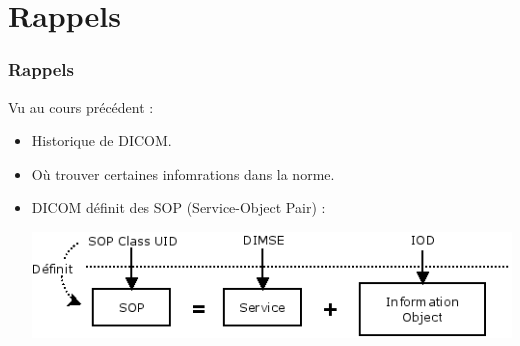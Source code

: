\section{Rappels}

\frame
{
	\frametitle{Rappels}
	Vu au cours pr\'ec\'edent :
	\begin{itemize}
		\item Historique de DICOM.
		\item Où trouver certaines infomrations dans la norme.
		\item DICOM d\'efinit des SOP (Service-Object Pair) :
		\begin{center}
			\includegraphics[width=\linewidth]{./figures/sop-definition.png}
		\end{center}
	\end{itemize}
}


